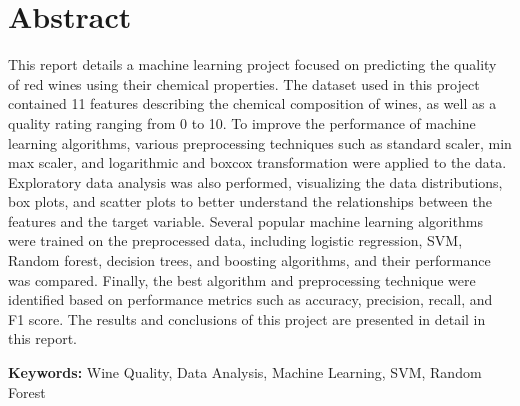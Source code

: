 \chapter{Abstract}
This report details a machine learning project focused on predicting the quality of red wines using their chemical properties. The dataset used in this project contained 11 features describing the chemical composition of wines, as well as a quality rating ranging from 0 to 10. To improve the performance of machine learning algorithms, various preprocessing techniques such as standard scaler, min max scaler, and logarithmic and boxcox transformation were applied to the data. Exploratory data analysis was also performed, visualizing the data distributions, box plots, and scatter plots to better understand the relationships between the features and the target variable. Several popular machine learning algorithms were trained on the preprocessed data, including logistic regression, SVM, Random forest, decision trees, and boosting algorithms, and their performance was compared. Finally, the best algorithm and preprocessing technique were identified based on performance metrics such as accuracy, precision, recall, and F1 score. The results and conclusions of this project are presented in detail in this report.

\textbf{Keywords:} Wine Quality, Data Analysis, Machine Learning, SVM, Random Forest






